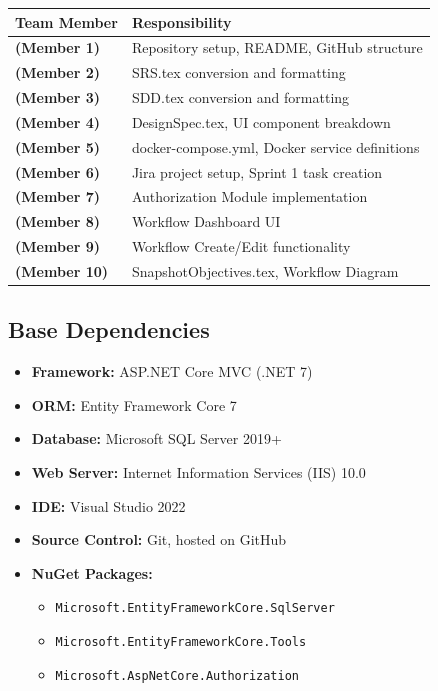 \documentclass[12pt]{article}
\begin{document}
\begin{center}
\begin{tabular}{>{\bfseries}p{4cm} p{9cm}}
\toprule
Team Member & Responsibility \\
\midrule
(Member 1) & Repository setup, README, GitHub structure \\
(Member 2) & SRS.tex conversion and formatting \\
(Member 3) & SDD.tex conversion and formatting \\
(Member 4) & DesignSpec.tex, UI component breakdown \\
(Member 5) & docker-compose.yml, Docker service definitions \\
(Member 6) & Jira project setup, Sprint 1 task creation \\
(Member 7) & Authorization Module implementation \\
(Member 8) & Workflow Dashboard UI \\
(Member 9) & Workflow Create/Edit functionality \\
(Member 10) & SnapshotObjectives.tex, Workflow Diagram \\
\bottomrule
\end{tabular}
\end{center}

\subsection{Base Dependencies}

\begin{itemize}
    \item \textbf{Framework:} ASP.NET Core MVC (.NET 7)
    \item \textbf{ORM:} Entity Framework Core 7
    \item \textbf{Database:} Microsoft SQL Server 2019+
    \item \textbf{Web Server:} Internet Information Services (IIS) 10.0
    \item \textbf{IDE:} Visual Studio 2022
    \item \textbf{Source Control:} Git, hosted on GitHub
    \item \textbf{NuGet Packages:}
    \begin{itemize}
        \item \texttt{Microsoft.EntityFrameworkCore.SqlServer}
        \item \texttt{Microsoft.EntityFrameworkCore.Tools}
        \item \texttt{Microsoft.AspNetCore.Authorization}
    \end{itemize}
\end{itemize}
\end{document}
